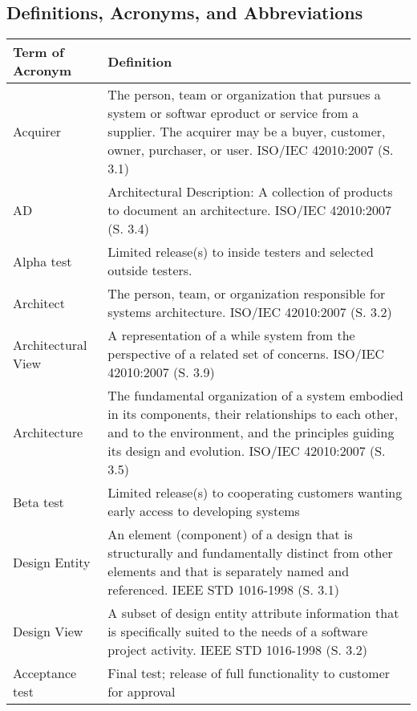 \documentclass[twoside,letterpaper]{article}
\begin{document}
\subsection{Definitions, Acronyms, and Abbreviations}
\begin{minipage}{\linewidth}
\centering
\begin{tabularx}{\textwidth}{lX}\toprule[1.5pt] %

\bf Term of Acronym & \bf Definition\\ \midrule[1.0pt]

Acquirer & The person, team or organization that pursues a system or softwar eproduct or service from a supplier.  The acquirer may be a buyer, customer, owner, purchaser, or user.  ISO/IEC 42010:2007 (S. 3.1) \\
AD & Architectural Description: A collection of products to document an architecture. ISO/IEC 42010:2007 (S. 3.4)\\
Alpha test & Limited release(s) to inside testers and selected outside testers.\\
Architect & The person, team, or organization responsible for systems architecture.  ISO/IEC 42010:2007 (S. 3.2)\\
Architectural View & A representation of a while system from the perspective of a related set of concerns.  ISO/IEC 42010:2007 (S. 3.9)\\
Architecture & The fundamental organization of a system embodied in its components, their relationships to each other, and to the environment, and the principles guiding its design and evolution.  ISO/IEC 42010:2007 (S. 3.5)\\
Beta test & Limited release(s) to cooperating customers wanting early access to developing systems\\
Design Entity & An element (component) of a design that is structurally and fundamentally distinct from other elements and that is separately named and referenced.  IEEE STD 1016-1998 (S. 3.1)\\
Design View & A subset of design entity attribute information that is specifically suited to the needs of a software project activity.  IEEE STD 1016-1998 (S. 3.2)\\
Acceptance test & Final test; release of full functionality to customer for approval\\

\end{tabularx}
\end{minipage}
\end{document}
